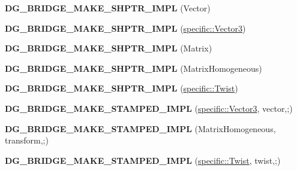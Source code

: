 \begin{DoxyCompactItemize}
\item 
{\bfseries D\+G\+\_\+\+B\+R\+I\+D\+G\+E\+\_\+\+M\+A\+K\+E\+\_\+\+S\+H\+P\+T\+R\+\_\+\+I\+M\+PL} (Vector)\hypertarget{namespacedynamic__graph_a75a4142b33cde4c86e2bc4b7b410be5a}{}\label{namespacedynamic__graph_a75a4142b33cde4c86e2bc4b7b410be5a}

\item 
{\bfseries D\+G\+\_\+\+B\+R\+I\+D\+G\+E\+\_\+\+M\+A\+K\+E\+\_\+\+S\+H\+P\+T\+R\+\_\+\+I\+M\+PL} (\hyperlink{classdynamic__graph_1_1specific_1_1Vector3}{specific\+::\+Vector3})\hypertarget{namespacedynamic__graph_a325010454ba7c2835ab21badc5fd1938}{}\label{namespacedynamic__graph_a325010454ba7c2835ab21badc5fd1938}

\item 
{\bfseries D\+G\+\_\+\+B\+R\+I\+D\+G\+E\+\_\+\+M\+A\+K\+E\+\_\+\+S\+H\+P\+T\+R\+\_\+\+I\+M\+PL} (Matrix)\hypertarget{namespacedynamic__graph_a9f8a93a86c41c53460cbe62b1838a12f}{}\label{namespacedynamic__graph_a9f8a93a86c41c53460cbe62b1838a12f}

\item 
{\bfseries D\+G\+\_\+\+B\+R\+I\+D\+G\+E\+\_\+\+M\+A\+K\+E\+\_\+\+S\+H\+P\+T\+R\+\_\+\+I\+M\+PL} (Matrix\+Homogeneous)\hypertarget{namespacedynamic__graph_a15169d3d19abe3ecd077c806664016f2}{}\label{namespacedynamic__graph_a15169d3d19abe3ecd077c806664016f2}

\item 
{\bfseries D\+G\+\_\+\+B\+R\+I\+D\+G\+E\+\_\+\+M\+A\+K\+E\+\_\+\+S\+H\+P\+T\+R\+\_\+\+I\+M\+PL} (\hyperlink{classdynamic__graph_1_1specific_1_1Twist}{specific\+::\+Twist})\hypertarget{namespacedynamic__graph_a7a18758dda76357a81bb50eeef37a4a7}{}\label{namespacedynamic__graph_a7a18758dda76357a81bb50eeef37a4a7}

\item 
{\bfseries D\+G\+\_\+\+B\+R\+I\+D\+G\+E\+\_\+\+M\+A\+K\+E\+\_\+\+S\+T\+A\+M\+P\+E\+D\+\_\+\+I\+M\+PL} (\hyperlink{classdynamic__graph_1_1specific_1_1Vector3}{specific\+::\+Vector3}, vector,;)\hypertarget{namespacedynamic__graph_a474a4d9778680dcc39de26f815269b5c}{}\label{namespacedynamic__graph_a474a4d9778680dcc39de26f815269b5c}

\item 
{\bfseries D\+G\+\_\+\+B\+R\+I\+D\+G\+E\+\_\+\+M\+A\+K\+E\+\_\+\+S\+T\+A\+M\+P\+E\+D\+\_\+\+I\+M\+PL} (Matrix\+Homogeneous, transform,;)\hypertarget{namespacedynamic__graph_a5f97d0a8fadb5d64c79d70749663bb04}{}\label{namespacedynamic__graph_a5f97d0a8fadb5d64c79d70749663bb04}

\item 
{\bfseries D\+G\+\_\+\+B\+R\+I\+D\+G\+E\+\_\+\+M\+A\+K\+E\+\_\+\+S\+T\+A\+M\+P\+E\+D\+\_\+\+I\+M\+PL} (\hyperlink{classdynamic__graph_1_1specific_1_1Twist}{specific\+::\+Twist}, twist,;)\hypertarget{namespacedynamic__graph_ad61ef9228a8796b5ad676f1dc3f7fa24}{}\label{namespacedynamic__graph_ad61ef9228a8796b5ad676f1dc3f7fa24}


\end{DoxyCompactItemize}
